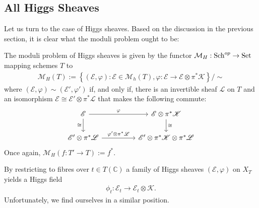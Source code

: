 \documentclass[12pt]{ociamthesis}  %
\begin{document}
\subsection{All Higgs Sheaves}

Let us turn to the case of Higgs sheaves. Based on the discussion
in the previous section, it is clear what the moduli problem ought to be:

\begin{definition}\label{def:higgs_moduli_problem}
  The moduli problem of Higgs sheaves is given by the functor
  $\mathcal M_H : \operatorname{Sch}^{op}\to \operatorname{Set}$ mapping schemes $T$ to
  \begin{align*}
    \mathcal M_H(T) := \left\lbrace{(\mathscr E,\varphi) : \mathscr E\in\mathcal M_h(T), \varphi : \mathscr E \to \mathscr E \otimes \pi^*\mathscr K }\right\rbrace/\sim
  \end{align*}
  where $(\mathscr E,\varphi)\sim(\mathscr E',\varphi')$ if, and only if,
  there is an invertible sheaf $\mathscr L$ on $T$ and an isomorphism
  $\mathscr E\cong\mathscr E'\otimes\pi^*\mathscr L$ that makes the following
  commute:
  \begin{equation*}
    \begin{tikzcd}
      {\mathscr E} && {\mathscr E\otimes \pi^*\mathscr K} \\
      {\mathscr E'\otimes\pi^*\mathscr L} && {\mathscr E'\otimes\pi^*\mathscr K\otimes\pi^*\mathscr L}
      \arrow["\varphi", from=1-1, to=1-3]
      \arrow["\cong"', from=1-1, to=2-1]
      \arrow["\cong", from=1-3, to=2-3]
      \arrow["{\varphi'\otimes\pi^*\mathscr L}", from=2-1, to=2-3]
    \end{tikzcd}
  \end{equation*}
  Once again, $\mathcal M_H(f : T' \to T) := f^*$.
\end{definition}
By restricting to fibres over $t\in T(\mathbb{C})$
a family of Higgs sheaves $(\mathscr E,\varphi)$ on $X_T$ yields
a Higgs field
\begin{align*}
  \phi_t : \mathscr E_t \to \mathscr E_t \otimes \mathscr K.
\end{align*}
Unfortunately, we find ourselves in a similar position.
\end{document}

